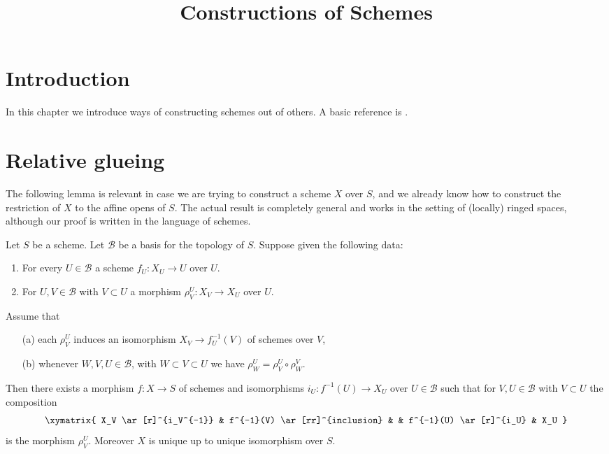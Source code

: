 

%


\title{Constructions of Schemes}


\maketitle

\label{section-phantom}

\tableofcontents

\section{Introduction}
\label{section-introduction}

\noindent
In this chapter we introduce ways of constructing schemes out of others.
A basic reference is \cite{EGA}.





\section{Relative glueing}
\label{section-relative-glueing}

\noindent
The following lemma is relevant in case we are trying to construct a
scheme $X$ over $S$, and we already know how to construct the restriction
of $X$ to the affine opens of $S$. The actual result is completely general
and works in the setting of (locally) ringed spaces, although our proof
is written in the language of schemes.

\begin{lemma}
\label{lemma-relative-glueing}
Let $S$ be a scheme.
Let $\mathcal{B}$ be a basis for the topology of $S$.
Suppose given the following data:
\begin{enumerate}
\item For every $U \in \mathcal{B}$ a scheme $f_U : X_U \to U$ over $U$.
\item For $U, V \in \mathcal{B}$ with $V \subset U$ a morphism
$\rho^U_V : X_V \to X_U$ over $U$.
\end{enumerate}
Assume that
\begin{enumerate}
\item[(a)] each $\rho^U_V$ induces an isomorphism
$X_V \to f_U^{-1}(V)$ of schemes over $V$,
\item[(b)] whenever $W, V, U \in \mathcal{B}$, with
$W \subset V \subset U$ we have $\rho^U_W = \rho^U_V \circ \rho ^V_W$.
\end{enumerate}
Then there exists a morphism $f : X \to S$ of schemes
and isomorphisms $i_U : f^{-1}(U) \to X_U$ over $U \in \mathcal{B}$
such that for $V, U \in \mathcal{B}$ with $V \subset U$ the composition
$$
\xymatrix{
X_V \ar[r]^{i_V^{-1}} &
f^{-1}(V) \ar[rr]^{inclusion} & &
f^{-1}(U) \ar[r]^{i_U} &
X_U
}
$$
is the morphism $\rho^U_V$. Moreover $X$ is unique up to
unique isomorphism over $S$.
\end{lemma}

